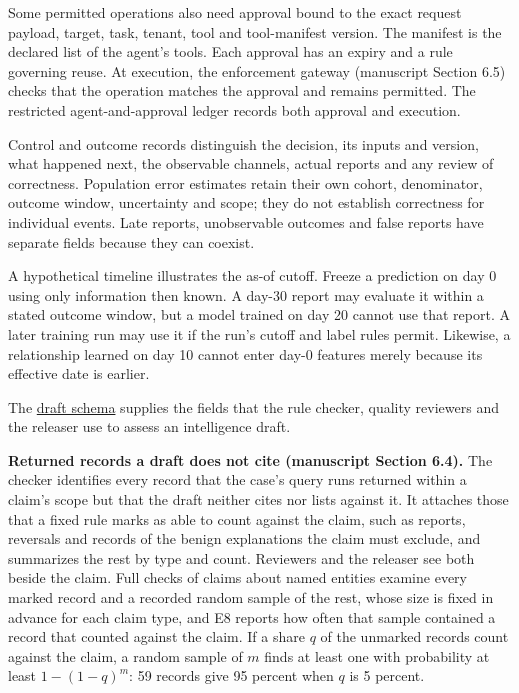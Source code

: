 \documentclass[
  11pt,
]{article}
\begin{document}
\endgroup

Some permitted operations also need approval bound to the exact request
payload, target, task, tenant, tool and tool-manifest version. The
manifest is the declared list of the agent's tools. Each approval has an
expiry and a rule governing reuse. At execution, the enforcement gateway
(manuscript Section 6.5) checks that the operation matches the approval
and remains permitted. The restricted agent-and-approval ledger records
both approval and execution.

Control and outcome records distinguish the decision, its inputs and
version, what happened next, the observable channels, actual reports and
any review of correctness. Population error estimates retain their own
cohort, denominator, outcome window, uncertainty and scope; they do not
establish correctness for individual events. Late reports, unobservable
outcomes and false reports have separate fields because they can
coexist.

A hypothetical timeline illustrates the as-of cutoff. Freeze a
prediction on day 0 using only information then known. A day-30 report
may evaluate it within a stated outcome window, but a model trained on
day 20 cannot use that report. A later training run may use it if the
run's cutoff and label rules permit. Likewise, a relationship learned on
day 10 cannot enter day-0 features merely because its effective date is
earlier.

The \href{SUPPLEMENT/S4_DRAFT_SCHEMA.csv}{draft schema} supplies the
fields that the rule checker, quality reviewers and the releaser use to
assess an intelligence draft.

\textbf{Returned records a draft does not cite (manuscript Section
6.4).} The checker identifies every record that the case's query runs
returned within a claim's scope but that the draft neither cites nor
lists against it. It attaches those that a fixed rule marks as able to
count against the claim, such as reports, reversals and records of the
benign explanations the claim must exclude, and summarizes the rest by
type and count. Reviewers and the releaser see both beside the claim.
Full checks of claims about named entities examine every marked record
and a recorded random sample of the rest, whose size is fixed in advance
for each claim type, and E8 reports how often that sample contained a
record that counted against the claim. If a share \(q\) of the unmarked
records count against the claim, a random sample of \(m\) finds at least
one with probability at least \(1-(1-q)^m\): 59 records give 95 percent
when \(q\) is 5 percent.
\end{document}
